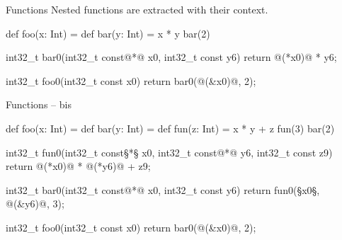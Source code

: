 \documentclass[10pt, compress, xcolor={usenames,dvipsnames}]{beamer}
\renewcommand{\emph}[1]{\alert{#1}}
\renewcommand{\hbar}{{\color{mLightBrown}\hrulefill}}
\begin{document}
\begin{frame}[fragile]{Functions}
  \emph{Nested} functions are extracted with their context.

  \hbar

  \begin{Scala}
def foo(x: Int) = {
  def bar(y: Int) = x * y
  bar(2)
}
  \end{Scala}

  \pause

  \vspace{-2em}

  \begin{C}
int32_t bar0(int32_t const@*@ x0, int32_t const y6)
{ return @(*x0)@ * y6; }

int32_t foo0(int32_t const x0)
{ return bar0(@(&x0)@, 2); }
  \end{C}

\end{frame}

\begin{frame}[fragile]{Functions -- bis}

  \begin{Scala}
def foo(x: Int) = {
  def bar(y: Int) = {
    def fun(z: Int) = x * y + z
    fun(3)
  }
  bar(2)
}
  \end{Scala}

  \pause

  \vspace{-2em}
  \vspace{-0.5em}

  \begin{C}
int32_t fun0(int32_t const§*§ x0, int32_t const@*@ y6, int32_t const z9)
{ return @(*x0)@ * @(*y6)@ + z9; }

int32_t bar0(int32_t const@*@ x0, int32_t const y6)
{ return fun0(§x0§, @(&y6)@, 3); }

int32_t foo0(int32_t const x0)
{ return bar0(@(&x0)@, 2); }
  \end{C}

\end{frame}
\end{document}
